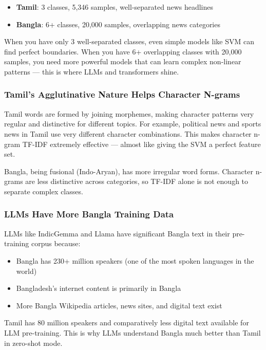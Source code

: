 \documentclass[conference]{IEEEtran}
\begin{document}
\begin{itemize}
\item \textbf{Tamil}: 3 classes, 5,346 samples, well-separated news headlines
\item \textbf{Bangla}: 6+ classes, 20,000 samples, overlapping news categories
\end{itemize}

When you have only 3 well-separated classes, even simple models like SVM can find perfect boundaries. When you have 6+ overlapping classes with 20,000 samples, you need more powerful models that can learn complex non-linear patterns --- this is where LLMs and transformers shine.

\subsubsection{Tamil's Agglutinative Nature Helps Character N-grams}

Tamil words are formed by joining morphemes, making character patterns very regular and distinctive for different topics. For example, political news and sports news in Tamil use very different character combinations. This makes character n-gram TF-IDF extremely effective --- almost like giving the SVM a perfect feature set.

Bangla, being fusional (Indo-Aryan), has more irregular word forms. Character n-grams are less distinctive across categories, so TF-IDF alone is not enough to separate complex classes.

\subsubsection{LLMs Have More Bangla Training Data}

LLMs like IndicGemma and Llama have significant Bangla text in their pre-training corpus because:
\begin{itemize}
\item Bangla has 230+ million speakers (one of the most spoken languages in the world)
\item Bangladesh's internet content is primarily in Bangla
\item More Bangla Wikipedia articles, news sites, and digital text exist
\end{itemize}

Tamil has 80 million speakers and comparatively less digital text available for LLM pre-training. This is why LLMs understand Bangla much better than Tamil in zero-shot mode.
\end{document}
